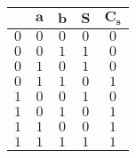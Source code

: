 	\begin{table}[H]
		\centering
		\begin{tabular}{|c|c|c|c|c|}
		\hline
		\rowcolor[HTML]{9B9B9B} 
		\multicolumn{1}{|l|}{\cellcolor[HTML]{9B9B9B}$\pmb{C_e}$} & \multicolumn{1}{l|}{\cellcolor[HTML]{9B9B9B}$\pmb{a}$} & \multicolumn{1}{l|}{\cellcolor[HTML]{9B9B9B}$\pmb{b}$} & \multicolumn{1}{l|}{\cellcolor[HTML]{9B9B9B}$\pmb{S}$} & \multicolumn{1}{l|}{\cellcolor[HTML]{9B9B9B}$\pmb{C_s}$}\\ \hline
		$0$ & $0$ & $0$ & $0$ & $0$ \\ \hline
		$0$ & $0$ & $1$ & $1$ & $0$ \\ \hline
		$0$ & $1$ & $0$ & $1$ & $0$ \\ \hline
		$0$ & $1$ & $1$ & $0$ & $1$ \\ \hline
		$1$ & $0$ & $0$ & $1$ & $0$ \\ \hline
		$1$ & $0$ & $1$ & $0$ & $1$ \\ \hline
		$1$ & $1$ & $0$ & $0$ & $1$  \\ \hline
		$1$ & $1$ & $1$ & $1$ & $1$ \\ \hline
		\end{tabular}
	\end{table}
	
